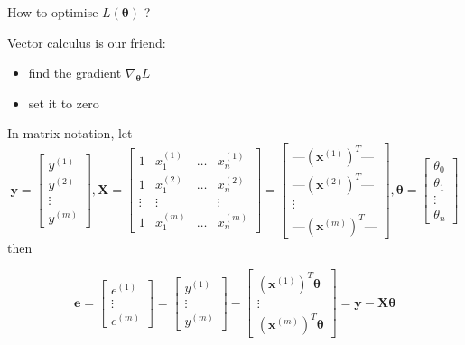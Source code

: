 \documentclass[ignorenonframetext,]{beamer}
\providecommand{\tightlist}{%
  \setlength{\itemsep}{0pt}\setlength{\parskip}{0pt}}
\newcommand{\vv}[1]{\boldsymbol{#1}}
\begin{document}
\begin{frame}{How to optimise \(L(\vv{\theta})\) ?}
\protect\hypertarget{how-to-optimise-lvvtheta}{}

Vector calculus is our friend:

\begin{itemize}
\tightlist
\item
  find the gradient \(\nabla_{\vv{\theta}} L\)
\item
  set it to zero
\end{itemize}

\bigskip

In matrix notation, let
\[\vv{y} = \begin{bmatrix} y^{(1)}\\ y^{(2)}\\ \vdots\\ y^{(m)} \end{bmatrix},  \vv{X} = \begin{bmatrix}
1 & x_1^{(1)} & \ldots & x_{n}^{(1)}\\
1 & x_1^{(2)} & \ldots & x_{n}^{(2)} \\
\vdots & \vdots & & \vdots \\
1 & x_1^{(m)} & \ldots & x_{n}^{(m)}
\end{bmatrix} = \begin{bmatrix} \text{---} (\vv{x}^{(1)})^T \text{---} \\
\text{---} (\vv{x}^{(2)})^T \text{---} \\
\vdots \\
 \text{---} (\vv{x}^{(m)})^T \text{---}
\end{bmatrix}, \vv{\theta} =\begin{bmatrix} \theta_0\\ \theta_1\\ \vdots \\ \theta_n\end{bmatrix}\]
then

\[\vv{e} = \begin{bmatrix} e^{(1)} \\ \vdots \\ e^{(m)}\end{bmatrix} = \begin{bmatrix} y^{(1)}\\ \vdots\\ y^{(m)} \end{bmatrix} - \begin{bmatrix} (\vv{x}^{(1)})^T \vv{\theta} \\
\vdots \\
 (\vv{x}^{(m)})^T \vv{\theta}
\end{bmatrix} = \vv{y} - \vv{X\theta}\]

\end{frame}
\end{document}
